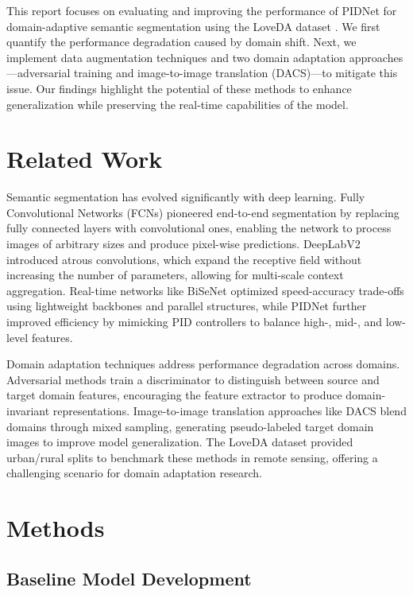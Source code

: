 \documentclass{article}
\begin{document}
\begin{multicols}{2}
		This report focuses on evaluating and improving the performance of PIDNet for domain-adaptive semantic segmentation using the LoveDA dataset \cite{loveda2021}. We first quantify the performance degradation caused by domain shift. Next, we implement data augmentation techniques and two domain adaptation approaches—adversarial training and image-to-image translation (DACS)—to mitigate this issue. Our findings highlight the potential of these methods to enhance generalization while preserving the real-time capabilities of the model.
		
		\section{Related Work}
		Semantic segmentation has evolved significantly with deep learning. Fully Convolutional Networks (FCNs) \cite{long2015fcn} pioneered end-to-end segmentation by replacing fully connected layers with convolutional ones, enabling the network to process images of arbitrary sizes and produce pixel-wise predictions. DeepLabV2 \cite{chen2018deeplab} introduced atrous convolutions, which expand the receptive field without increasing the number of parameters, allowing for multi-scale context aggregation. Real-time networks like BiSeNet \cite{yu2018bisenet} optimized speed-accuracy trade-offs using lightweight backbones and parallel structures, while PIDNet \cite{pidnet2023} further improved efficiency by mimicking PID controllers to balance high-, mid-, and low-level features.
		
		Domain adaptation techniques address performance degradation across domains. Adversarial methods \cite{tsai2018learning} train a discriminator to distinguish between source and target domain features, encouraging the feature extractor to produce domain-invariant representations. Image-to-image translation approaches like DACS \cite{tranheden2021dacs} blend domains through mixed sampling, generating pseudo-labeled target domain images to improve model generalization. The LoveDA dataset \cite{loveda2021} provided urban/rural splits to benchmark these methods in remote sensing, offering a challenging scenario for domain adaptation research.
		
\section{Methods}
\subsection{Baseline Model Development}

\end{multicols}
\end{document}
